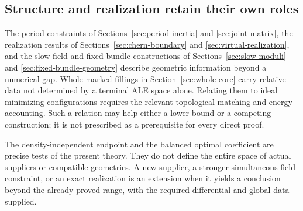 \subsection{Structure and realization retain their own roles}
The period constraints of Sections~\ref{sec:period-inertia} and
\ref{sec:joint-matrix}, the realization results of
Sections~\ref{sec:chern-boundary} and \ref{sec:virtual-realization},
and the slow-field and fixed-bundle constructions of
Sections~\ref{sec:slow-moduli} and \ref{sec:fixed-bundle-geometry}
describe geometric information beyond a numerical gap. Whole marked
fillings in Section~\ref{sec:whole-core} carry relative data not
determined by a terminal ALE space alone. Relating them to ideal
minimizing configurations \cite{Anderson2005} requires the relevant
topological matching and energy accounting. Such a relation may help
either a lower bound or a competing construction; it is not prescribed
as a prerequisite for every direct proof.

The density-independent endpoint and the balanced optimal coefficient
are precise tests of the present theory. They do not define the entire
space of actual suppliers or compatible geometries. A new supplier,
a stronger simultaneous-field constraint, or an exact realization is
an extension when it yields a conclusion beyond the already proved
range, with the required differential and global data supplied.

